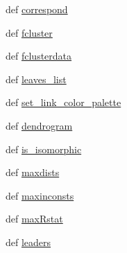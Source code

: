 \begin{DoxyCompactItemize}
\item 
def \hyperlink{namespacescipy_1_1cluster_1_1hierarchy_a7dbe3f6eb0f37504ba37c6fd4fa82672}{correspond}
\item 
def \hyperlink{namespacescipy_1_1cluster_1_1hierarchy_adab69119d3ded3eea468daaa4fa49d66}{fcluster}
\item 
def \hyperlink{namespacescipy_1_1cluster_1_1hierarchy_a098505df307702564c947c14783dd2b5}{fclusterdata}
\item 
def \hyperlink{namespacescipy_1_1cluster_1_1hierarchy_a955f956758f76e1b11a971b1fee79ea8}{leaves\+\_\+list}
\item 
def \hyperlink{namespacescipy_1_1cluster_1_1hierarchy_afc5f59df78e8ca0e6ed5d93317e6c90e}{set\+\_\+link\+\_\+color\+\_\+palette}
\item 
def \hyperlink{namespacescipy_1_1cluster_1_1hierarchy_a2942d06d7f30b74eed25bd2c0330d15a}{dendrogram}
\item 
def \hyperlink{namespacescipy_1_1cluster_1_1hierarchy_abeae371603f7ba0b6834fad572137ed3}{is\+\_\+isomorphic}
\item 
def \hyperlink{namespacescipy_1_1cluster_1_1hierarchy_a94a7225fdc03418ef902fa333dcab176}{maxdists}
\item 
def \hyperlink{namespacescipy_1_1cluster_1_1hierarchy_adc774e7e5e48fb37a71fc5195bdd6ee4}{maxinconsts}
\item 
def \hyperlink{namespacescipy_1_1cluster_1_1hierarchy_a0ea12331b90b1b1220456a4e97dfcf4f}{max\+Rstat}
\item 
def \hyperlink{namespacescipy_1_1cluster_1_1hierarchy_adf1642f47e85e138ea1e697387dec17c}{leaders}
\end{DoxyCompactItemize}
